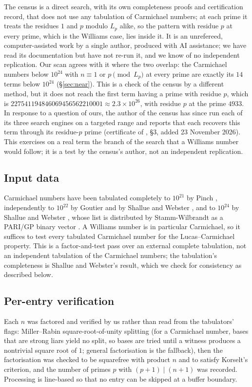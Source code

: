 \documentclass[11pt]{amsart}
\theoremstyle{definition}
\theoremstyle{remark}
\begin{document}
The census is a direct search, with its own completeness proofs and certification record, that does not use any tabulation of Carmichael numbers; at each prime it treats the residues $1$ and $p$ modulo $L_p$ alike, so the pattern with residue $p$ at every prime, which is the Williams case, lies inside it. It is an unrefereed, computer-assisted work by a single author, produced with AI assistance; we have read its documentation but have not re-run it, and we know of no independent replication. Our scan agrees with it where the two overlap: the Carmichael numbers below $10^{24}$ with $n\equiv1$ or $p\pmod{L_p}$ at every prime are exactly its $14$ terms below $10^{24}$ (\S\ref{sec:near}). This is a check of the census by a different method, but it does not reach the first term having a prime with residue $p$, which is $227541194846069456562210001\approx2.3\times10^{26}$, with residue $p$ at the prime $4933$. In response to a question of ours, the author of the census has since run each of its three search engines on a targeted range and reports that each recovers this term through its residue-$p$ prime (certificate of \cite{Pud30}, \S3, added 23 November 2026). This exercises on a real term the branch of the search that a Williams number would follow; it is a test by the census's author, not an independent replication.

\subsection*{Input data} Carmichael numbers have been tabulated completely to $10^{21}$ by Pinch \cite{PinchTables}, independently to $10^{22}$ by Goutier \cite{Goutier} and by Shallue and Webster \cite{SW24}, and to $10^{24}$ by Shallue and Webster \cite{SW25}, whose list is distributed by Stamm-Wilbrandt as a PARI/GP binary vector \cite{SW_bin}. A Williams number is in particular Carmichael, so it suffices to test every tabulated Carmichael number for the Lucas--Carmichael property. This is a factor-and-test pass over an external complete tabulation, not an independent tabulation of the Carmichael numbers; the tabulation's completeness is Shallue and Webster's result, which we check for consistency as described below.

\subsection*{Per-entry verification} Each $n$ was factored and verified by us rather than read from the tabulators' flags: Miller--Rabin square-root-of-unity splitting (for a Carmichael number, bases that are strong liars yield no split, so bases are tried until a witness produces a nontrivial square root of $1$; general factorisation is the fallback), then the factorisation was checked to be squarefree with product $n$ and to satisfy Korselt's criterion, and the number of primes $p$ with $(p+1)\mid(n+1)$ was recorded. Processing is line-based so that no entry can be skipped at a buffer boundary.
\end{document}
